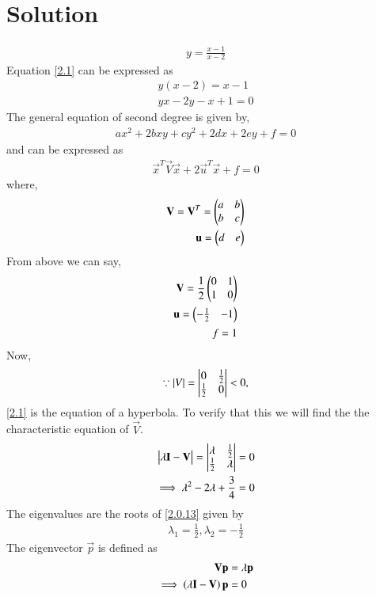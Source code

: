 \documentclass[journal,12pt,twocolumn]{IEEEtran}
\begin{document}
  \section{\textbf{Solution}}
\begin{align}
y=\frac{x-1}{x-2}\label{2.1}
\end{align}
Equation \eqref{2.1} can be expressed as
\begin{align}
y(x-2)=x-1\\
yx-2y-x+1=0\label{2.0.3}
\end{align}
The general equation of second degree is given by,
\begin{align}
ax^2+2bxy+cy^2+2dx+2ey+f=0
\end{align}
and can be expressed as
\begin{align}
\vec{x}^T\vec{V}\vec{x}+2\vec{u}^T\vec{x}+f=0
\end{align}
where,
\begin{align}
\mathbf{V}=\mathbf{V}^T=\begin{pmatrix}a&b\\b&c\end{pmatrix}\\
\mathbf{u}=\begin{pmatrix}d&e\end{pmatrix}
\end{align}
From above we can say,
\begin{align}
\mathbf{V}=\frac{1}{2}\begin{pmatrix}0 & 1\\ 1 & 0\end{pmatrix}\\
\mathbf{u}=\begin{pmatrix}-\frac{1}{2}&-1\end{pmatrix}\\
f=1
\end{align}
Now,
\begin{align}
\because \left\vert V\right\vert = \begin{vmatrix}0& \frac{1}{2} \\ \frac{1}{2} & 0\end{vmatrix} < 0,
\end{align}
\eqref{2.1} is the equation of a hyperbola. To verify that this we will find the the characteristic equation of $\vec{V}$.
\begin{align}
\begin{vmatrix}\lambda \mathbf{I}-\mathbf{V}\end{vmatrix} = \begin{vmatrix}\lambda  & \frac{1}{2}\\ \frac{1}{2} & \lambda \end{vmatrix} &= 0
\\
\implies \lambda^2 - 2\lambda + \frac{3}{4} &= 0
\label{2.0.13}
\end{align}
The eigenvalues are the roots of \eqref{2.0.13} given by
\begin{align}
\lambda_1 = \frac{1}{2}, \lambda_2 = -\frac{1}{2}
\label{2.0.14}
\end{align}
The eigenvector $\vec{p}$ is defined as
\begin{align}
\mathbf{V} \mathbf{p}&= \lambda \mathbf{p}
\\
\implies \left(\lambda\mathbf{I}-\mathbf{V}\right)\mathbf{p} &=0
\end{align}
\end{document}
